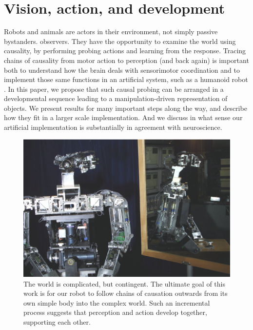 
\section{Vision, action, and development}

Robots and animals are actors in their environment, not simply passive
\ifrev
bystanders.
\else
observers.  
\fi
They have the opportunity to examine the world using
causality, by performing probing actions and learning from the
response.  
Tracing chains of causality from motor action to perception
(and back again) is important both to understand how the brain deals
with sensorimotor coordination and to implement those same functions
in an artificial system, such as a humanoid robot \cite{sperber-premack-premack-1995}.
In this paper, we propose that such causal probing can be arranged in
a developmental sequence leading to a manipulation-driven
representation of objects.  We present results for many important steps
along the way, and describe how they fit in a larger scale implementation.
And we discuss in what sense our artificial implementation is substantially 
in agreement with neuroscience. 

\ifverbose
\begin{figure}[\figtbh]
\begin{center}
\includegraphics[width=12cm]{mirror-cog.eps}
\caption{ 
%
The world is complicated, but contingent.
The ultimate goal of this work is for our robot to follow chains of
causation outwards from its own simple body into the complex world.
Such an incremental process suggests that perception and action
develop together, supporting each other.
%
}
\label{fig:mirror-cog}
\end{center}
\end{figure}
\fi


